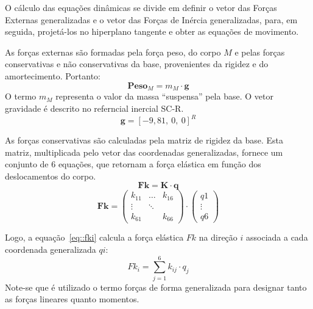 O cálculo das equações dinâmicas se divide em definir o vetor das Forças
Externas generalizadas e o vetor das Forças de Inércia generalizadas, para, em
seguida, projetá-los no hiperplano tangente e obter as equações de movimento.

As forças externas são formadas pela força peso, do corpo $M$ e
pelas forças conservativas e não conservativas da base, provenientes da rigidez
e do amortecimento. Portanto:
%
\begin{equation}
	\mathbf{Peso}_M = m_M \cdot \mathbf{g}
\end{equation}
%
O termo $m_M$ representa o valor da massa ``suspensa'' pela base. O vetor
gravidade é descrito no referncial inercial SC-R.
%
\begin{equation}
	\mathbf{g} = [-9,81,~0,~0]^{R}
\end{equation}
%


As forças conservativas são calculadas pela matriz de rigidez da base. Esta
matriz, multiplicada pelo vetor das coordenadas generalizadas, fornece um
conjunto de 6 equações, que retornam a força elástica em função dos
deslocamentos do corpo.
%
\begin{equation}
	\mathbf{Fk} = \mathbf{K} \cdot \mathbf{q}
\end{equation}
\begin{equation}
	\mathbf{Fk} = \begin{pmatrix} 
    k_{11} & \dots 	& k_{16} \\
    \vdots & \ddots & \\
    k_{61} &        & k_{66} 
    \end{pmatrix} \cdot 
    \begin{pmatrix} 
    q1 \\ 
    \vdots \\ 
    q6 
    \end{pmatrix}
\end{equation}


Logo, a equação~\ref{eq::fki} calcula a força elástica $Fk$ na direção $i$
associada a cada coordenada generalizada $qi$:
%
\begin{equation} \label{eq::fki}
	Fk_i = \sum_{j=1}^{6} k_{ij} \cdot q_j
\end{equation}
%
Note-se que é utilizado o termo forças de forma generalizada para designar tanto
as forças lineares quanto momentos.

